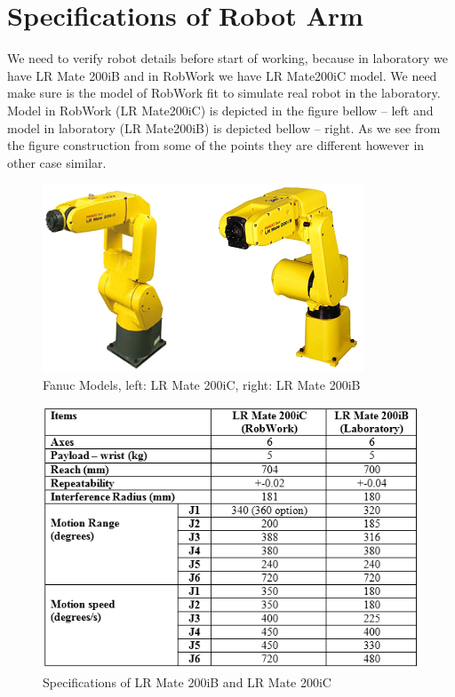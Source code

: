 \section{Specifications of Robot Arm}
\label{sec:spec}

We need to verify robot details before start of working, because in laboratory we have LR Mate 200iB and in RobWork we have LR Mate200iC model. We need make sure is the model of RobWork fit to simulate real robot in the laboratory. Model in RobWork (LR Mate200iC) is depicted in the figure bellow – left and model in laboratory (LR Mate200iB) is depicted bellow – right. As we see from the figure construction from some of the points they are different however in other case similar.

\begin{figure}[H]
  \centering
  \includegraphics[scale= 0.8]{source/fanucModelPhoto.png}
  \caption{Fanuc Models, left: LR Mate 200iC, right: LR Mate 200iB}
  \label{fig:FanucModels}
\end{figure}

\begin{figure}[H]
  \centering
  \includegraphics[scale= 1]{source/table1.png}
  \caption{Specifications of LR Mate 200iB and LR Mate 200iC}
  \label{fig:tableSpecifications}
\end{figure}

